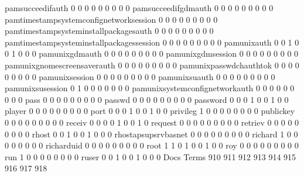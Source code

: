 \documentclass[compress,8pt]{beamer}
\begin{document}
\begin{frame}
\begin{Schunk}
  pamsucceedifauth                           0   0   0   0   0   0   0   0   0
  pamsucceedifgdmauth                        0   0   0   0   0   0   0   0   0
  pamtimestampsystemconfignetworksession     0   0   0   0   0   0   0   0   0
  pamtimestampsysteminstallpackagesauth      0   0   0   0   0   0   0   0   0
  pamtimestampsysteminstallpackagessession   0   0   0   0   0   0   0   0   0
  pamunixauth                                0   0   1   0   0   1   0   0   0
  pamunixgdmauth                             0   0   0   0   0   0   0   0   0
  pamunixgdmsession                          0   0   0   0   0   0   0   0   0
  pamunixgnomescreensaverauth                0   0   0   0   0   0   0   0   0
  pamunixpasswdchauthtok                     0   0   0   0   0   0   0   0   0
  pamunixsession                             0   0   0   0   0   0   0   0   0
  pamunixsuauth                              0   0   0   0   0   0   0   0   0
  pamunixsusession                           0   1   0   0   0   0   0   0   0
  pamunixsystemconfignetworkauth             0   0   0   0   0   0   0   0   0
  pass                                       0   0   0   0   0   0   0   0   0
  passwd                                     0   0   0   0   0   0   0   0   0
  password                                   0   0   0   1   0   0   1   0   0
  player                                     0   0   0   0   0   0   0   0   0
  port                                       0   0   0   1   0   0   1   0   0
  privileg                                   1   0   0   0   0   0   0   0   0
  publickey                                  0   0   0   0   0   0   0   0   0
  receiv                                     0   0   0   0   1   0   0   1   0
  request                                    0   0   0   0   0   0   0   0   0
  retriev                                    0   0   0   0   0   0   0   0   0
  rhost                                      0   0   1   0   0   1   0   0   0
  rhostapsupsrvbasnet                        0   0   0   0   0   0   0   0   0
  richard                                    1   0   0   0   0   0   0   0   0
  richarduid                                 0   0   0   0   0   0   0   0   0
  root                                       1   1   0   1   0   0   1   0   0
  roy                                        0   0   0   0   0   0   0   0   0
  run                                        1   0   0   0   0   0   0   0   0
  ruser                                      0   0   1   0   0   1   0   0   0
                                          Docs
Terms                                      910 911 912 913 914 915 916 917 918

\end{Schunk}
\end{frame}
\end{document}
